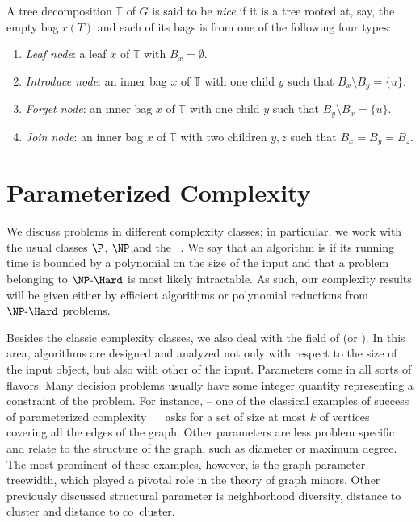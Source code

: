 \begin{class_definition*}
    A tree decomposition $\mathbb{T}$ of $G$ is said to be \emph{nice} if it is a tree rooted at, say, the empty bag $r(T)$ and each of its bags is from one of the following four types:
    \begin{enumerate}
        \item \emph{Leaf node}: a leaf $x$ of $\mathbb{T}$ with $B_x = \emptyset$.
        \item \emph{Introduce node}: an inner bag $x$ of $\mathbb{T}$ with one child $y$ such that $B_x \setminus B_y = \{u\}$.
        \item \emph{Forget node}: an inner bag $x$ of $\mathbb{T}$ with one child $y$ such that $B_y \setminus B_x = \{u\}$.
        \item \emph{Join node}: an inner bag $x$ of $\mathbb{T}$ with two children $y,z$ such that $B_x = B_y = B_z$.
    \end{enumerate}
\end{class_definition*}

\section{Parameterized Complexity}

We discuss problems in different complexity classes; in particular, we work with the usual classes $\P$, $\NP$,and the ~\citep{polynomial_hierarchy}.
We say that an algorithm is  if its running time is bounded by a polynomial on the size of the input and that a problem belonging to $\NPH$ is most likely intractable.
As such, our complexity results will be given either by efficient algorithms or polynomial reductions from $\NPH$ problems.

Besides the classic complexity classes, we also deal with the field of  (or ).
In this area, algorithms are designed and analyzed not only with respect to the size of the input object, but also with other  of the input.
Parameters come in all sorts of flavors.
Many decision problems usually have some integer quantity representing a constraint of the problem.
For instance,  -- one of the classical examples of success of parameterized complexity ~~ asks for a set of size at most $k$ of vertices covering all the edges of the graph.
Other parameters are less problem specific and relate to the structure of the graph, such as diameter or maximum degree.
The most prominent of these examples, however, is the graph parameter treewidth, which played a pivotal role in the theory of graph minors.
Other previously discussed structural parameter is neighborhood diversity, distance to cluster and distance to co~cluster.


